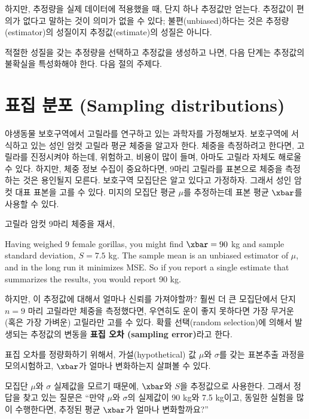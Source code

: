 
하지만, 추정량을 실제 데이터에 적용했을 때,
단지 하나 추정값만 얻는다. 추정값이 편의가 없다고 말하는 것이 의미가 없을 수 있다; 불편(unbiased)하다는 것은 추정량(estimator)의 성질이지 추정값(estimate)의 성질은 아니다.

적절한 성질을 갖는 추정량을 선택하고 추정값을 생성하고 나면, 다음 단계는 추정값의 불확실을 특성화해야 한다. 다음 절의 주제다.


\section{표집 분포 (Sampling distributions)}
\label{gorilla}

야생동물 보호구역에서 고릴라를 연구하고 있는 과학자를 가정해보자.
보호구역에 서식하고 있는 성인 암컷 고릴라 평균 체중을 알고자 한다.
체중을 측정하려고 한다면, 고릴라를 진정시켜야 하는데, 위험하고, 비용이 많이 들며, 아마도 고릴라 자체도 해로울 수 있다.
하지만, 체중 정보 수집이 중요하다면, 9마리 고릴라를 표본으로 체중을 측정하는 것은 용인될지 모른다.
보호구역 모집단은 알고 있다고 가정하자. 그래서 성인 암컷 대표 표본을 고를 수 있다. 미지의 모집단 평균 $\mu$를 추정하는데 표본 평균 $\xbar$를 사용할 수 있다.

고릴라 암컷 9마리 체중을 재서, 

Having weighed 9 female gorillas, you might find $\xbar=90$ kg and
sample standard deviation, $S=7.5$ kg.  The sample mean
is an unbiased estimator of $\mu$, and in the long run it
minimizes MSE.  So if you report a single
estimate that summarizes the results, you would report 90 kg.

하지만, 이 추정값에 대해서 얼마나 신뢰를 가져야할까?
훨씬 더 큰 모집단에서 단지 $n=9$ 마리 고릴라만 체중을 측정했다면, 우연히도 운이 좋지 못하다면 가장 무거운 (혹은 가장 가벼운) 고릴라만 고를 수 있다.
확률 선택(random selection)에 의해서 발생되는 추정값의 변동을 {\bf 표집 오차 (sampling error)}라고 한다.

표집 오차를 정량화하기 위해서, 가설(hypothetical) 값 $\mu$와 $\sigma$를 갖는 표본추출 과정을 모의시험하고, $\xbar$가 얼마나 변화하는지 살펴볼 수 있다.

모집단 $\mu$와 $\sigma$ 실제값을 모르기 때문에, 
$\xbar$와 $S$을 추정값으로 사용한다. 
그래서 정답을 찾고 있는 질문은
``만약 $\mu$와 $\sigma$의 실제값이 90 kg와 7.5 kg이고,
동일한 실험을 많이 수행한다면, 추정된 평균 $\xbar$가 얼마나 변화할까요?''

